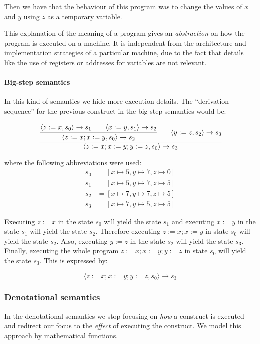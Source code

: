 Then we have that the behaviour of this program was to change the values of $x$ and $y$ using $z$ as a temporary variable.


This explanation of the meaning of a program gives an \textit{abstraction} on how the program is executed on a machine.
It is independent from the architecture and implementation strategies of a particular machine, due to the fact that details like the use of registers or addresses for variables are not relevant.

\paragraph{Big-step semantics}

In this kind of semantics we hide more execution details.
The \enquote{derivation sequence} for the previous construct in the big-step semantics would be:

\begin{equation*}
\cfrac{
  \cfrac{\langle z:=x, s_{0}\rangle \rightarrow s_{1} \qquad \langle x:=y, s_{1} \rangle \rightarrow s_{2}}
    {\langle z:=x; x:=y, s_{0} \rangle \rightarrow s_{2}}
  \qquad
  \langle y:=z, s_{2} \rangle \rightarrow s_{3}
  }
  {\langle z:=x; x:=y; y:=z, s_{0} \rangle \rightarrow s_{3}}
\end{equation*}

where the following abbreviations were used:
\begin{align*}
s_{0} &= [x\mapsto5, y\mapsto7, z\mapsto0]\\
s_{1} &= [x\mapsto5, y\mapsto7, z\mapsto5]\\
s_{2} &= [x\mapsto7, y\mapsto7, z\mapsto5]\\
s_{3} &= [x\mapsto7, y\mapsto5, z\mapsto5]
\end{align*}

Executing $z:=x$ in the state $s_{0}$ will yield the state $s_{1}$ and executing $x:=y$ in the state $s_{1}$ will yield the state $s_{2}$.
Therefore executing $z:=x; x:=y$ in state $s_{0}$ will yield the state $s_{2}$.
Also, executing $y:=z$ in the state $s_{2}$ will yield the state $s_{3}$.
Finally, executing the whole program $z:=x; x:=y; y:=z$ in state $s_{0}$ will yield the state $s_{3}$.
This is expressed by:

\begin{equation*}
\langle z:=x; x:=y; y:=z, s_{0} \rangle \rightarrow s_{3}
\end{equation*}


\subsubsection{Denotational semantics}
In the denotational semantics we stop focusing on \textit{how} a construct is executed and redirect our focus to the \textit{effect} of executing the construct.
We model this approach by mathematical functions.

